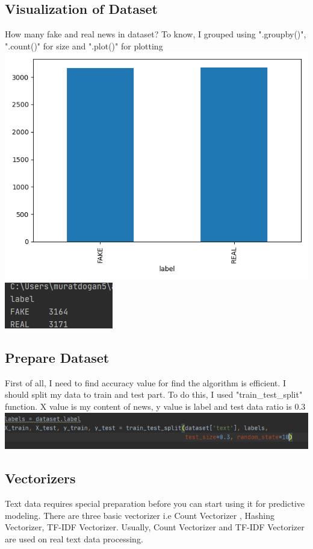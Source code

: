 \documentclass[onecolumn]{article}
\begin{document}
\subsection{Visualization of Dataset}
How many fake and real news in dataset? To know, I grouped using ".groupby()", ".count()" for size and ".plot()" for plotting\bigskip\newline
\includegraphics[scale=0.3]{fig/count.PNG}
\includegraphics[scale=1]{fig/count2.PNG}

\subsection{Prepare Dataset}
First of all, I need to find accuracy value for find the algorithm is efficient. I should split my data to train and test part. To do this, I used "train\_test\_split" function. X value is my content of news, y value is label and test data ratio is 0.3
\bigskip\newline
\includegraphics[scale=0.7]{fig/3.PNG}

\subsection{Vectorizers}
Text data requires special preparation before you can start using it for predictive modeling. There are three basic vectorizer i.e Count Vectorizer , Hashing Vectorizer, TF-IDF Vectorizer. Usually, Count Vectorizer and TF-IDF Vectorizer are used on real text data processing.
\end{document}
